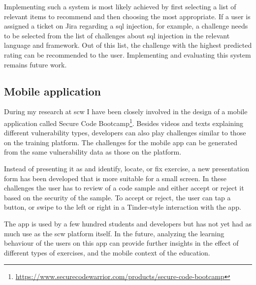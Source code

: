 Implementing such a system is most likely achieved by first selecting a list of relevant items to recommend and then choosing the most appropriate.
If a user is assigned a ticket on Jira regarding a \gls{sql} injection, for example, a challenge needs to be selected from the list of challenges about \gls{sql} injection in the relevant language and framework.
Out of this list, the challenge with the highest predicted rating can be recommended to the user.
Implementing and evaluating this system remains future work.

\subsection{Mobile application}
During my research at \gls{scw} I have been closely involved in the design of a mobile application called Secure Code Bootcamp\footnote{\url{https://www.securecodewarrior.com/products/secure-code-bootcamp}}.
Besides videos and texts explaining different vulnerability types, developers can also play challenges similar to those on the training platform.
The challenges for the mobile app can be generated from the same vulnerability data as those on the platform.

Instead of presenting it as and identify, locate, or fix exercise, a new presentation form has been developed that is more suitable for a small screen.
In these challenges the user has to review of a code sample and either accept or reject it based on the security of the sample.
To accept or reject, the user can tap a button, or swipe to the left or right in a Tinder-style interaction with the app. 

The app is used by a few hundred students and developers but has not yet had as much use as the \gls{scw} platform itself.
In the future, analyzing the learning behaviour of the users on this app can provide further insights in the effect of different types of exercises, and the mobile context of the education.